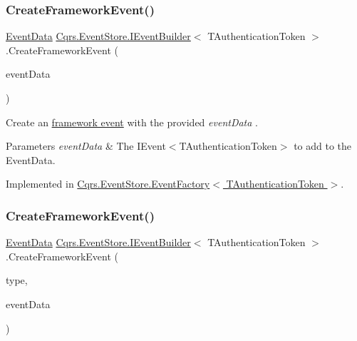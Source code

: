 \subsubsection{\texorpdfstring{Create\+Framework\+Event()}{CreateFrameworkEvent()}\hspace{0.1cm}{\footnotesize\ttfamily [2/4]}}
{\footnotesize\ttfamily \hyperlink{classCqrs_1_1Events_1_1EventData}{Event\+Data} \hyperlink{interfaceCqrs_1_1EventStore_1_1IEventBuilder}{Cqrs.\+Event\+Store.\+I\+Event\+Builder}$<$ T\+Authentication\+Token $>$.Create\+Framework\+Event (\begin{DoxyParamCaption}\item[{\hyperlink{interfaceCqrs_1_1Events_1_1IEvent}{I\+Event}$<$ T\+Authentication\+Token $>$}]{event\+Data }\end{DoxyParamCaption})}



Create an \hyperlink{}{framework event} with the provided {\itshape event\+Data} . 


\begin{DoxyParams}{Parameters}
{\em event\+Data} & The I\+Event$<$\+T\+Authentication\+Token$>$ to add to the Event\+Data.\\
\hline
\end{DoxyParams}


Implemented in \hyperlink{classCqrs_1_1EventStore_1_1EventFactory_ae514998a8368283f882014cc0db5b2b2_ae514998a8368283f882014cc0db5b2b2}{Cqrs.\+Event\+Store.\+Event\+Factory$<$ T\+Authentication\+Token $>$}.

\mbox{\label{interfaceCqrs_1_1EventStore_1_1IEventBuilder_ab9608f44e12ce029fc98ad0eee53516a_ab9608f44e12ce029fc98ad0eee53516a}} 
\subsubsection{\texorpdfstring{Create\+Framework\+Event()}{CreateFrameworkEvent()}\hspace{0.1cm}{\footnotesize\ttfamily [3/4]}}
{\footnotesize\ttfamily \hyperlink{classCqrs_1_1Events_1_1EventData}{Event\+Data} \hyperlink{interfaceCqrs_1_1EventStore_1_1IEventBuilder}{Cqrs.\+Event\+Store.\+I\+Event\+Builder}$<$ T\+Authentication\+Token $>$.Create\+Framework\+Event (\begin{DoxyParamCaption}\item[{string}]{type,  }\item[{\hyperlink{interfaceCqrs_1_1Events_1_1IEvent}{I\+Event}$<$ T\+Authentication\+Token $>$}]{event\+Data }\end{DoxyParamCaption})}



